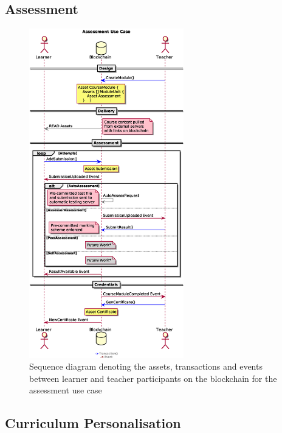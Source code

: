 \subsection{Assessment}

\begin{figure}[!ht] 
    \centering    
    \includegraphics[width=0.6\textwidth]{assessmentloop}
    \caption[Assessment Use Case]
        {Sequence diagram denoting the assets, transactions and events between 
        learner and teacher participants on the blockchain for the assessment use case} 
    \label{fig:assessmentloop}
\end{figure}

\subsection{Curriculum Personalisation}

